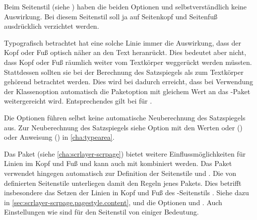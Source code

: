 Beim Seitenstil %
 (siehe
) %
haben die beiden Optionen  und
 selbstverständlich keine Auswirkung. Bei diesem
Seitenstil soll ja auf Seitenkopf und
Seitenfuß ausdrücklich verzichtet werden.

Typografisch betrachtet hat eine solche Linie immer
die Auswirkung, dass der Kopf oder Fuß optisch näher an den Text heranrückt.
Dies bedeutet aber nicht, dass Kopf oder Fuß räumlich weiter vom
Textkörper weggerückt werden müssten.  Stattdessen sollten
sie bei der Berechnung des Satzspiegels als zum Textkörper gehörend
betrachtet werden. Dies wird bei  dadurch erreicht, dass bei
Verwendung der Klassenoption  automatisch die Paketoption
%
 mit gleichem Wert an das
\hyperref[cha:typearea]{}-Paket weitergereicht
wird. Entsprechendes gilt bei  für
%
.

Die Optionen führen selbst keine automatische Neuberechnung des Satzspiegels
aus. Zur Neuberechnung des Satzspiegels siehe Option
 mit den Werten  oder
 () oder Anweisung
() in \autoref{cha:typearea}.

Das Paket \hyperref[cha:scrlayer-scrpage]{}%
%
 (siehe
\autoref{cha:scrlayer-scrpage}) bietet weitere Einflussmöglichkeiten für
Linien im Kopf und Fuß und kann auch mit  kombiniert
werden. Das Paket  verwendet hingegen automatisch
\hyperref[cha:scrlayer-scrpage]{} zur Definition der
Seitenstile  und
.  Die von
 definierten Seitenstile
unterliegen damit den Regeln jenes Pakets. Dies betrifft insbesondere das
Setzen der Linien in Kopf und Fuß des
\hyperref[desc:\LabelBase.pagestyle.plain.letter]{}-Seitenstils
. Siehe dazu in
\autoref{sec:scrlayer-scrpage.pagestyle.content},
 und
 die Optionen
 und
. Auch Einstellungen wie
 sind für den Seitenstil
 von einiger Bedeutung.%
%
\EndIndexGroup


